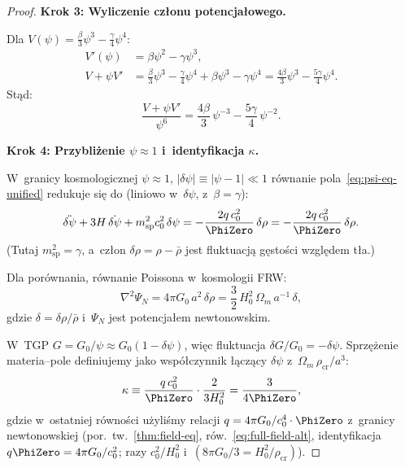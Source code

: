 \begin{proof}
\medskip\noindent\textbf{Krok 3: Wyliczenie cz\l{}onu potencja\l{}owego.}

Dla $V(\psi) = \frac{\beta}{3}\psi^3 - \frac{\gamma}{4}\psi^4$:
\begin{align}
  V'(\psi) &= \beta\psi^2 - \gamma\psi^3, \\
  V + \psi V' &= \frac{\beta}{3}\psi^3 - \frac{\gamma}{4}\psi^4
    + \beta\psi^3 - \gamma\psi^4
    = \frac{4\beta}{3}\psi^3 - \frac{5\gamma}{4}\psi^4.
\end{align}
St\k{a}d:
\[
  \frac{V + \psi V'}{\psi^6}
  = \frac{4\beta}{3}\,\psi^{-3} - \frac{5\gamma}{4}\,\psi^{-2}.
\]

\medskip\noindent\textbf{Krok 4: Przybli\.zenie $\psi \approx 1$ i~identyfikacja $\kappa$.}

W~granicy kosmologicznej $\psi \approx 1$,
$|\delta\psi| \equiv |\psi - 1| \ll 1$ r\'ownanie
pola~\eqref{eq:psi-eq-unified} redukuje si\k{e} do
(liniowo w~$\delta\psi$, z~$\beta = \gamma$):
\begin{equation}\label{eq:cosmo-linearized-unified}
  \ddot{\delta\psi} + 3H\,\dot{\delta\psi}
  + m_{\mathrm{sp}}^2 c_0^2\,\delta\psi
  = -\frac{2q\,c_0^2}{\PhiZero}\,\delta\rho
  = -\frac{2q\,c_0^2}{\PhiZero}\,\delta\rho.
\end{equation}
(Tutaj $m_{\mathrm{sp}}^2 = \gamma$,
a~cz\l{}on $\delta\rho = \rho - \bar\rho$ jest fluktuacj\k{a}
g\k{e}sto\'sci wzgl\k{e}dem t\l{}a.)

Dla por\'ownania, r\'ownanie Poissona w~kosmologii FRW:
\begin{equation}\label{eq:poisson-frw}
  \nabla^2\Psi_N = 4\pi G_0\,a^2\,\delta\rho
  = \frac{3}{2}\,H_0^2\,\Omega_m\,a^{-1}\,\delta,
\end{equation}
gdzie $\delta = \delta\rho/\bar\rho$ i~$\Psi_N$ jest
potencja\l{}em newtonowskim.

W~TGP $G = G_0/\psi \approx G_0(1 - \delta\psi)$,
wi\k{e}c fluktuacja $\delta G/G_0 = -\delta\psi$.
Sprz\k{e}\.zenie materia--pole definiujemy jako
wsp\'o\l{}czynnik \l{}\k{a}cz\k{a}cy $\delta\psi$
z~$\Omega_m\,\rho_{\mathrm{cr}}/a^3$:
\begin{equation}\label{eq:kappa-def-operational}
  \kappa \equiv \frac{q\,c_0^2}{\PhiZero}
  \cdot\frac{2}{3H_0^2}
  = \frac{3}{4\PhiZero},
\end{equation}
gdzie w~ostatniej r\'owno\'sci u\.zyli\'smy relacji
$q = 4\pi G_0/c_0^4 \cdot \PhiZero$
z~granicy newtonowskiej (por.\ tw.~\ref{thm:field-eq},
r\'ow.~\eqref{eq:full-field-alt}, identyfikacja
$q\PhiZero = 4\pi G_0/c_0^2$; razy $c_0^2/H_0^2$
i~$(8\pi G_0/3 = H_0^2/\rho_{\mathrm{cr}})$).


\end{proof}
